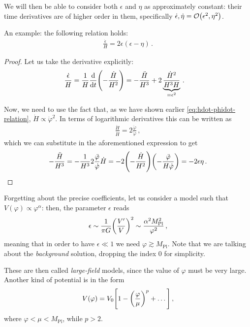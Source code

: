 \documentclass[main.tex]{subfiles}
\begin{document}
We will then be able to consider both \(\epsilon \) and \(\eta\) as approximately constant: their time derivatives are of higher order in them, specifically \(\dot{\epsilon}, \dot{\eta} = \order{\epsilon^2, \eta^2}\).

\begin{claim}
An example: the following relation holds: 
%
\begin{align}
\frac{\dot{\epsilon}}{H} = 2 \epsilon (\epsilon - \eta )
\,.
\end{align}
\end{claim}

\begin{proof}
Let us take the derivative explicitly: 
%
\begin{align}
\frac{\dot{\epsilon}}{H} &= \frac{1}{H} \dv{}{t} \qty(- \frac{\dot{H}}{H^2}) = - \frac{\ddot{H}}{H^3} + 2 \underbrace{\frac{\dot{H}^2}{H^{3} H}}_{= \epsilon^2}
\,.
\end{align}

Now, we need to use the fact that, as we have shown earlier \eqref{eq:hdot-phidot-relation}, \(\dot{H} \propto \dot{\varphi}^2\). In terms of logarithmic derivatives this can be written as 
%
\begin{align}
\frac{\ddot{H}}{\dot{H}} = 2\frac{\ddot{\varphi}}{\dot{\varphi}}
\,,
\end{align}
%
which we can substitute in the aforementioned expression to get 
%
\begin{align}
- \frac{\ddot{H}}{H^3} = - \frac{1}{H^3} 2 \frac{\ddot{\varphi}}{\dot{\varphi}} \dot{H} = -2 \qty(- \frac{\dot{H}}{H^2}) \qty(-\frac{\ddot{\varphi}}{H \dot{\varphi}}) = -2 \epsilon \eta 
\,.
\end{align}
\end{proof}

Forgetting about the precise coefficients, let us consider a model such that \(V(\varphi ) \propto \varphi^{\alpha }\): then, the parameter \(\epsilon \) reads
%
\begin{align}
\epsilon \sim \frac{1}{\pi G} \qty(\frac{V'}{V})^2 \sim \frac{\alpha^2 M _{\text{Pl}}^2}{\varphi^2}
\,,
\end{align}
%
meaning that in order to have \(\epsilon \ll 1\) we need \(\varphi \gtrsim M _{\text{Pl}}\). 
Note that we are talking about the \emph{background} solution, dropping the index \(0\) for simplicity.

These are then called \emph{large-field} models, since the value of \(\varphi \) must be very large. 
Another kind of potential is in the form 
%
\begin{align}
V(\varphi ) = V_0 \qty[1 - \qty(\frac{\varphi }{\mu })^{p } + \dots]
\,,
\end{align}
%
where \(\varphi < \mu < M _{\text{Pl}}\), while \(p > 2\). 
\end{document}
